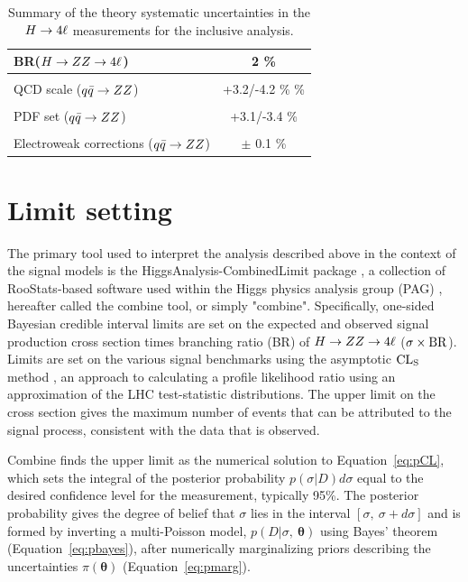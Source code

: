 \begin{table}[!htb]
\begin{center}
\begin{tabular}{|lc|}
BR($H\to ZZ\to4\ell$) & 2 \% \\
\hline %
\vspace{-0.4cm} & \\
QCD scale ($q\bar{q}\to ZZ$) & +3.2/-4.2 \% \% \\
\vspace{-0.4cm} & \\
PDF set ($q\bar{q}\to ZZ$) & +3.1/-3.4 \% \\
\vspace{-0.4cm} & \\
Electroweak corrections ($q\bar{q}\to ZZ$) & $\pm$ 0.1 \% \\
\hline %
\hline %
\end{tabular}
\caption{Summary of the theory systematic uncertainties in the $H\to4\ell$ measurements for the inclusive analysis.
\label{tab:SystOverviewTheo}
}
\normalsize
\end{center}
\end{table}
 
\section{Limit setting}

The primary tool used to interpret the analysis described above in the context of the signal models is the HiggsAnalysis-CombinedLimit package \cite{combinetwiki}, a collection of RooStats-based software \cite{roostatstwiki} used within the Higgs physics analysis group (PAG) \cite{higgspagtwiki}, hereafter called the combine tool, or simply "combine". Specifically, one-sided Bayesian credible interval limits are set on the expected and observed signal production cross section times branching ratio (BR) of $H\to ZZ\to4\ell$ ($\sigma\times \rm{BR}$). Limits are set on the various signal benchmarks using the asymptotic $\rm{CL}_S$ method \cite{Cowan:2010js}, an approach to calculating a profile likelihood ratio using an approximation of the LHC test-statistic distributions. The upper limit on the cross section gives the maximum number of events that can be attributed to the signal process, consistent with the data that is observed. 

Combine finds the upper limit as the numerical solution to Equation~\ref{eq:pCL}, which sets the integral of the posterior probability $p(\sigma|D)d\sigma$ equal to the desired confidence level for the measurement, typically 95\%. The posterior probability gives the degree of belief that $\sigma$ lies in the interval $[\sigma,\ \sigma+d\sigma]$ and is formed by inverting a multi-Poisson model, $p(D|\sigma,\ \bm{\theta})$ using Bayes' theorem (Equation~\ref{eq:pbayes}), after numerically marginalizing priors describing the uncertainties $\pi(\bm{\theta})$ (Equation~\ref{eq:pmarg}).

